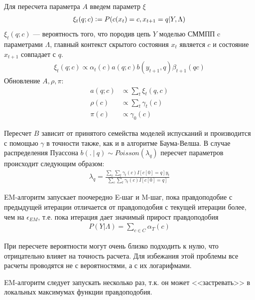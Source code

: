 \documentclass{matmex-diploma-custom}
\begin{document}
\begin{enumerate}
Для пересчета параметра $A$ введем параметр $\xi$
\begin{align*}
\xi_{t}(q;c) \mathrel{\mathop:}= P(c(x_{t})=c, x_{t+1} = q| Y, \Lambda)
\end{align*}
$\xi_{t}(q;c)$ --- вероятность того, что породив цепь $Y$ моделью СММПП c параметрами $\Lambda$, 
главный контекст скрытого состояния $ x_{t} $ является $c$ и состояние $ x_{t+1} $ совпадает с $q$.
\begin{align}
\xi_{t}(q;c) \propto {\alpha_{t}(c)a(q;c)b(y_{t+1},q)\beta_{t+1}(qc)} 
\label{formula:xi}
\end{align}
Обновление $ A , \rho, \pi$:
\begin{align}
a(q; c) &\propto \sum_{t}{\xi_{t}(q,c)} 
\label{formula:a}
\\\rho(c) &\propto \sum_{t}{\gamma_{t}(c)}
\\\pi(c) &\propto \gamma_{0}(c)
\end{align}

Пересчет $ B $ зависит от принятого семейства моделей испусканий и производится с помощью $ \gamma $ в точности также, как и в алгоритме Баума-Велша.
В случае распределения Пуассона
$b(.~|~q) \sim \textit{Poisson}(\lambda_{q})$ 
пересчет параметров происходит следующим образом:
\begin{align}
\lambda_{q} = \frac{\sum_{c}\sum_{t}{\gamma_{t}(c)I[c[0]=q]y_{t}}}{\sum_{c}\sum_{t}{\gamma_{t}(c)I[c[0]=q]}}
\end{align}
\end{enumerate}
EM-алгоритм запускает поочередно E-шаг и M-шаг, пока правдоподобие с предыдущей итерации отличается от правдоподобия с текущей итерации более, чем на $ \epsilon_{\textit{EM}}$, т.е. пока итерация дает значимый прирост правдоподобия
\begin{align}
P(Y| \Lambda) = \sum_{c \in C}\alpha_{T}(c)
\end{align}

\begin{remark} При пересчете вероятности могут очень близко подходить к нулю, что отрицательно влияет на точность расчета. Для избежания этой проблемы все расчеты проводятся не с вероятностями, а с их логарифмами.
\end{remark}

\begin{remark} EM-алгоритм следует запускать несколько раз, т.к. он может <<застревать>> в локальных максимумах функции правдоподобия.
\end{remark}
\end{document}
